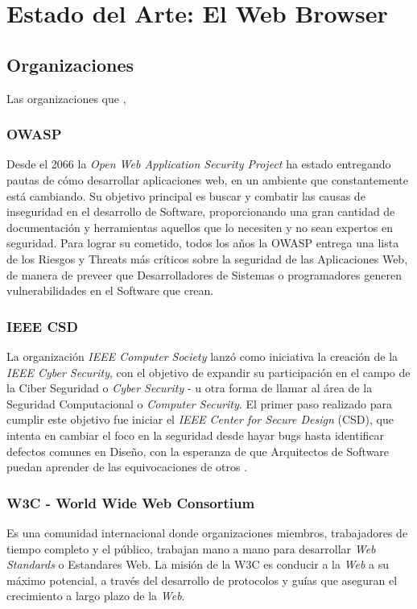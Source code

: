 \chapter{Estado del Arte: El Web Browser}
\label{chap:chap2}



\section{Organizaciones}
\label{chap:Orgs}
Las organizaciones que ,

\subsection{OWASP}
Desde el 2066 la \textit{Open Web Application Security Project} ha estado entregando pautas de cómo desarrollar aplicaciones web, en un ambiente que constantemente está cambiando. Su objetivo principal es buscar y combatir las causas de inseguridad en el desarrollo de Software, proporcionando una gran cantidad de documentación y herramientas aquellos que lo necesiten y no sean expertos en seguridad. Para lograr su cometido, todos los años la OWASP entrega una lista de los Riesgos y Threats más críticos sobre la seguridad de las Aplicaciones Web, de manera de preveer que Desarrolladores de Sistemas o programadores generen vulnerabilidades en el Software que crean.


\subsection{IEEE CSD}
La organización \textit{IEEE Computer Society} lanzó como iniciativa la creación de la \textit{IEEE Cyber Security}, con el objetivo de expandir su participación en el campo de la Ciber Seguridad o \textit{Cyber Security} - u otra forma de llamar al área de la Seguridad Computacional o \textit{Computer Security}. El primer paso realizado para cumplir este objetivo fue iniciar el \textit{IEEE Center for Secure Design} (CSD), que intenta en cambiar el foco en la seguridad desde hayar bugs hasta identificar defectos comunes en Diseño, con la esperanza de que Arquitectos de Software puedan aprender de las equivocaciones de otros \cite{ieeecsd1}.



\subsection{W3C - World Wide Web Consortium}
Es una comunidad internacional donde organizaciones miembros, trabajadores de tiempo completo y el público, trabajan mano a mano para desarrollar \textit{Web Standards} o Estandares Web. La misión de la W3C es conducir a la \textit{Web} a su máximo potencial, a través del desarrollo de protocolos y guías que aseguran el crecimiento a largo plazo de la \textit{Web}.




